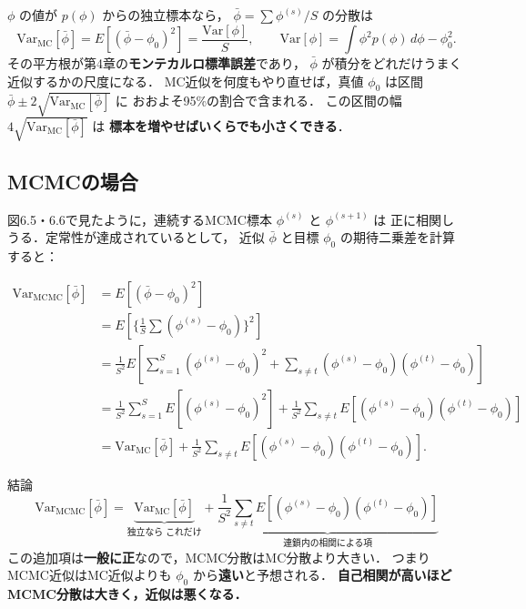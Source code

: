 \documentclass[lualatex,ja=standard,a4paper,12pt]{bxjsarticle}
\begin{document}
$\phi$ の値が $p(\phi)$ からの独立標本なら，
$\bar{\phi} = \sum \phi^{(s)}/S$ の分散は
\[
  \mathrm{Var}_{\mathrm{MC}}[\bar{\phi}]
  = E[(\bar{\phi} - \phi_0)^2]
  = \frac{\mathrm{Var}[\phi]}{S},
  \qquad
  \mathrm{Var}[\phi] = \int \phi^2 p(\phi)\, d\phi - \phi_0^2.
\]
その平方根が第4章の\textbf{モンテカルロ標準誤差}であり，
$\bar{\phi}$ が積分をどれだけうまく近似するかの尺度になる．
MC近似を何度もやり直せば，真値 $\phi_0$ は区間
$\bar{\phi} \pm 2\sqrt{\mathrm{Var}_{\mathrm{MC}}[\bar{\phi}]}$ に
おおよそ95\%の割合で含まれる．
この区間の幅 $4\sqrt{\mathrm{Var}_{\mathrm{MC}}[\bar{\phi}]}$ は
\textbf{標本を増やせばいくらでも小さくできる}．

\subsection*{MCMCの場合}

図6.5・6.6で見たように，連続するMCMC標本 $\phi^{(s)}$ と $\phi^{(s+1)}$ は
正に相関しうる．定常性が達成されているとして，
近似 $\bar{\phi}$ と目標 $\phi_0$ の期待二乗差を計算すると：

\begin{align*}
  \mathrm{Var}_{\mathrm{MCMC}}[\bar{\phi}]
  &= E[(\bar{\phi} - \phi_0)^2] \\
  &= E\!\left[\Big\{\tfrac{1}{S}\textstyle\sum (\phi^{(s)} - \phi_0)\Big\}^2\right] \\
  &= \frac{1}{S^2} E\!\left[\sum_{s=1}^{S}(\phi^{(s)} - \phi_0)^2
      + \sum_{s \ne t}(\phi^{(s)} - \phi_0)(\phi^{(t)} - \phi_0)\right] \\
  &= \frac{1}{S^2}\sum_{s=1}^{S} E[(\phi^{(s)} - \phi_0)^2]
      + \frac{1}{S^2}\sum_{s \ne t} E[(\phi^{(s)} - \phi_0)(\phi^{(t)} - \phi_0)] \\
  &= \mathrm{Var}_{\mathrm{MC}}[\bar{\phi}]
      + \frac{1}{S^2}\sum_{s \ne t} E[(\phi^{(s)} - \phi_0)(\phi^{(t)} - \phi_0)].
\end{align*}

\begin{thmbox}{結論}
\[
  \mathrm{Var}_{\mathrm{MCMC}}[\bar{\phi}]
  = \underbrace{\mathrm{Var}_{\mathrm{MC}}[\bar{\phi}]}_{\text{独立なら これだけ}}
  + \underbrace{\frac{1}{S^2}\sum_{s \ne t} E[(\phi^{(s)} - \phi_0)(\phi^{(t)} - \phi_0)]}_{\text{連鎖内の相関による項}}
\]
この追加項は\textbf{一般に正}なので，MCMC分散はMC分散より大きい．
つまりMCMC近似はMC近似よりも $\phi_0$ から\textbf{遠い}と予想される．
\textbf{自己相関が高いほどMCMC分散は大きく，近似は悪くなる．}
\end{thmbox}
\end{document}
